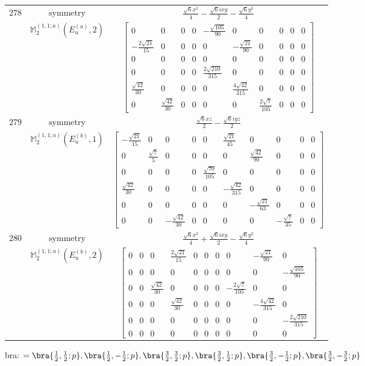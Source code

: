 \documentclass[fleqn,8pt,landscape]{jsarticle}
\begin{document}
\begin{longtable}{ccc}
$ 278 $ & $ \text{symmetry} $ & $ \frac{\sqrt{6} x^{2}}{4} - \frac{\sqrt{6} i x y}{2} - \frac{\sqrt{6} y^{2}}{4} $ \\
$  $ & $ \mathbb{M}_{2}^{(1,1;a)}(E_{u}^{(a)},2) $ & $ \begin{bmatrix} 0 & 0 & 0 & 0 & - \frac{\sqrt{105}}{90} & 0 & 0 & 0 & 0 & 0 \\ - \frac{2 \sqrt{21}}{15} & 0 & 0 & 0 & 0 & - \frac{\sqrt{21}}{90} & 0 & 0 & 0 & 0 \\ 0 & 0 & 0 & 0 & 0 & 0 & 0 & 0 & 0 & 0 \\ 0 & 0 & 0 & 0 & \frac{2 \sqrt{210}}{315} & 0 & 0 & 0 & 0 & 0 \\ \frac{\sqrt{42}}{30} & 0 & 0 & 0 & 0 & \frac{4 \sqrt{42}}{315} & 0 & 0 & 0 & 0 \\ 0 & \frac{\sqrt{42}}{30} & 0 & 0 & 0 & 0 & \frac{2 \sqrt{7}}{105} & 0 & 0 & 0 \end{bmatrix} $ \\ \hline
$ 279 $ & $ \text{symmetry} $ & $ \frac{\sqrt{6} x z}{2} - \frac{\sqrt{6} i y z}{2} $ \\
$  $ & $ \mathbb{M}_{2}^{(1,1;a)}(E_{u}^{(b)},1) $ & $ \begin{bmatrix} - \frac{\sqrt{21}}{15} & 0 & 0 & 0 & 0 & \frac{\sqrt{21}}{45} & 0 & 0 & 0 & 0 \\ 0 & \frac{\sqrt{7}}{5} & 0 & 0 & 0 & 0 & \frac{\sqrt{42}}{90} & 0 & 0 & 0 \\ 0 & 0 & 0 & 0 & \frac{\sqrt{70}}{105} & 0 & 0 & 0 & 0 & 0 \\ \frac{\sqrt{42}}{30} & 0 & 0 & 0 & 0 & - \frac{\sqrt{42}}{315} & 0 & 0 & 0 & 0 \\ 0 & 0 & 0 & 0 & 0 & 0 & - \frac{\sqrt{21}}{63} & 0 & 0 & 0 \\ 0 & 0 & - \frac{\sqrt{42}}{30} & 0 & 0 & 0 & 0 & - \frac{\sqrt{7}}{35} & 0 & 0 \end{bmatrix} $ \\ \hline
$ 280 $ & $ \text{symmetry} $ & $ \frac{\sqrt{6} x^{2}}{4} + \frac{\sqrt{6} i x y}{2} - \frac{\sqrt{6} y^{2}}{4} $ \\
$  $ & $ \mathbb{M}_{2}^{(1,1;a)}(E_{u}^{(b)},2) $ & $ \begin{bmatrix} 0 & 0 & 0 & \frac{2 \sqrt{21}}{15} & 0 & 0 & 0 & 0 & - \frac{\sqrt{21}}{90} & 0 \\ 0 & 0 & 0 & 0 & 0 & 0 & 0 & 0 & 0 & - \frac{\sqrt{105}}{90} \\ 0 & 0 & \frac{\sqrt{42}}{30} & 0 & 0 & 0 & 0 & - \frac{2 \sqrt{7}}{105} & 0 & 0 \\ 0 & 0 & 0 & \frac{\sqrt{42}}{30} & 0 & 0 & 0 & 0 & - \frac{4 \sqrt{42}}{315} & 0 \\ 0 & 0 & 0 & 0 & 0 & 0 & 0 & 0 & 0 & - \frac{2 \sqrt{210}}{315} \\ 0 & 0 & 0 & 0 & 0 & 0 & 0 & 0 & 0 & 0 \end{bmatrix} $ \\ \hline
\end{longtable}
bra: $=\bra{\frac{1}{2},\frac{1}{2};p}, \bra{\frac{1}{2},- \frac{1}{2};p}, \bra{\frac{3}{2},\frac{3}{2};p}, \bra{\frac{3}{2},\frac{1}{2};p}, \bra{\frac{3}{2},- \frac{1}{2};p}, \bra{\frac{3}{2},- \frac{3}{2};p}$
\end{document}
